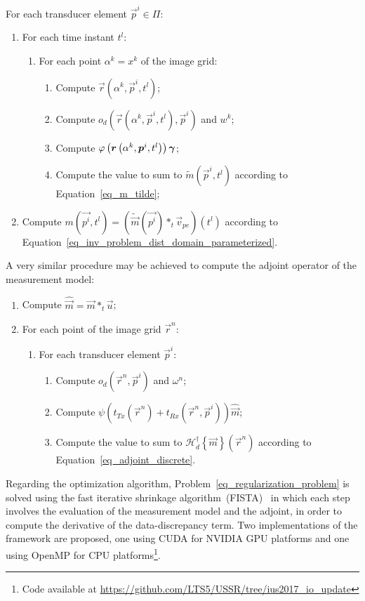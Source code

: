 \documentclass[conference]{IEEEtran}
\begin{document}
For each transducer element $\vec{p}^i \in \Pi$:
\begin{enumerate}
	\item For each time instant $t^l$:
	\begin{enumerate}
		\item For each point $\alpha^k = x^k$ of the image grid:
		\begin{enumerate}
			\item Compute $\vec{r}\left(\alpha^k, \vec{p}^i, t^l\right)$;
			\item Compute $o_d\left(\vec{r}\left(\alpha^k, \vec{p}^i, t^l\right), \vec{p}^i\right)$ and $w^k$;
			\item Compute $\varphi \left(\bm{r}\left(\alpha^k, \bm{p}^i, t^l\right)\right) \bm{\gamma}$;
			\item Compute the value to sum to $\tilde{m}\left(\vec{p}^i, t^l\right)$ according to Equation~\eqref{eq_m_tilde};
		\end{enumerate} 
	\end{enumerate}
	\item Compute $m \left(\vec{p^i}, t^l\right) = \left(\tilde{\vec{m}} \left(\vec{p^i}\right) \ast_t \vec{v}_{pe}\right) \left(t^l\right)$ according to Equation~\eqref{eq_inv_problem_dist_domain_parameterized}.
\end{enumerate}

A very similar procedure may be achieved to compute the adjoint operator of the measurement model:
\begin{enumerate}
	\item Compute $\hat{\vec{m}} = \vec{m} \ast_t \vec{u}$;
	\item For each point of the image grid $\vec{r}^n$:
	\begin{enumerate}
		\item For each transducer element $\vec{p}^i$:
		\begin{enumerate}
			\item Compute $o_d\left(\vec{r}^n, \vec{p}^i\right)$ and $\omega^n$;
			\item Compute $\psi \left(t_{Tx}\left(\vec{r}^n\right) + t_{Rx} \left( \vec{r}^n, \vec{p}^i \right) \right) \hat{\vec{m}}$;
			\item Compute the value to sum to $\mathcal{H}_d^\dagger \left\lbrace\vec{m}\right\rbrace \left(\vec{r}^n\right)$ according to Equation~\eqref{eq_adjoint_discrete}.
		\end{enumerate}
	\end{enumerate}
\end{enumerate}
Regarding the optimization algorithm, Problem~\eqref{eq_regularization_problem} is solved using the fast iterative shrinkage algorithm~(FISTA)~\cite{Beck_SIAM_2009} in which each step involves the evaluation of the measurement model and the adjoint, in order to compute the derivative of the data-discrepancy term. Two implementations of the framework are proposed, one using CUDA for NVIDIA GPU platforms and one using OpenMP for CPU platforms\footnote{Code available at \url{https://github.com/LTS5/USSR/tree/ius2017_io_update}}.
\end{document}
